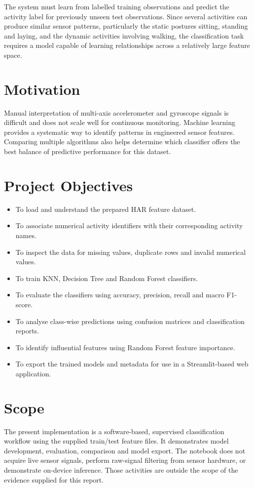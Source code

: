 The system must learn from labelled training observations and predict the activity label for previously unseen test observations. Since several activities can produce similar sensor patterns, particularly the static postures sitting, standing and laying, and the dynamic activities involving walking, the classification task requires a model capable of learning relationships across a relatively large feature space.

\section{Motivation}
Manual interpretation of multi-axis accelerometer and gyroscope signals is difficult and does not scale well for continuous monitoring. Machine learning provides a systematic way to identify patterns in engineered sensor features. Comparing multiple algorithms also helps determine which classifier offers the best balance of predictive performance for this dataset.

\section{Project Objectives}
\begin{itemize}
\item To load and understand the prepared HAR feature dataset.
\item To associate numerical activity identifiers with their corresponding activity names.
\item To inspect the data for missing values, duplicate rows and invalid numerical values.
\item To train KNN, Decision Tree and Random Forest classifiers.
\item To evaluate the classifiers using accuracy, precision, recall and macro F1-score.
\item To analyse class-wise predictions using confusion matrices and classification reports.
\item To identify influential features using Random Forest feature importance.
\item To export the trained models and metadata for use in a Streamlit-based web application.
\end{itemize}

\section{Scope}
The present implementation is a software-based, supervised classification workflow using the supplied train/test feature files. It demonstrates model development, evaluation, comparison and model export. The notebook does not acquire live sensor signals, perform raw-signal filtering from sensor hardware, or demonstrate on-device inference. Those activities are outside the scope of the evidence supplied for this report.

